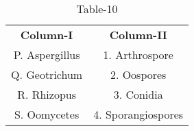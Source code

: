 \begin{table}[htbp]
  \centering
  \caption{Table-10}
  \label{table10}
  \begin{tabular}{cc}
\textbf{Column-I} & \textbf{Column-II}\\

P. Aspergillus & 1. Arthrospore \\
Q. Geotrichum & 2. Oospores \\
R. Rhizopus & 3. Conidia \\
S. Oomycetes & 4. Sporangiospores \\
  
  
  
  \end{tabular}
\end{table}